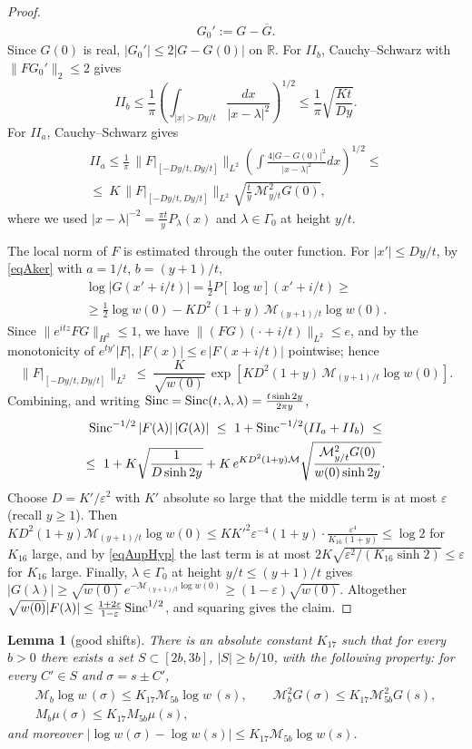 \documentclass[11pt,twoside,reqno]{amsart}
\def\R{{\mathbb R}}
\def\MM{{\mathcal M}}
\def\e{\varepsilon}
\def\l{\lambda}
\def\G{\Gamma}
\def\s{\sigma}
\def\S{\text{\rm Sinc}}
\theoremstyle{plain}
\newtheorem{lemma}{Lemma}
\numberwithin{equation}{section}
\begin{document}
\begin{proof}
$$\begin{gathered}
G_0':=G-\overline G .\end{gathered}$$
Since $G(0)$ is real, $|G_0'|\leq2|G-G(0)|$ on $\R$. For $II_b$, Cauchy--Schwarz with $\|FG_0'\|_2\leq2$ gives
$$II_b\leq\frac1\pi\left(\int_{|x|>Dy/t}\frac{dx}{|x-\l|^2}\right)^{1/2}\leq\frac1\pi\sqrt{\frac{Kt}{Dy}} .$$
For $II_a$, Cauchy--Schwarz gives
$$\begin{gathered}II_a\leq\frac1\pi\,\big\|F\big|_{[-Dy/t,Dy/t]}\big\|_{L^2}\left(\int\frac{4|G-G(0)|^2}{|x-\l|^2}dx\right)^{1/2}
\leq\\ \leq\ K\,\big\|F\big|_{[-Dy/t,Dy/t]}\big\|_{L^2}\sqrt{\frac{t}{y}\,\MM^2_{y/t}G(0)},\end{gathered}$$
where we used $|x-\l|^{-2}=\frac{\pi t}{y}P_\l(x)$ and $\l\in\G_0$ at height $y/t$.

The local norm of $F$ is estimated through the outer function. For $|x'|\leq Dy/t$, by \eqref{eqAker} with $a=1/t$, $b=(y+1)/t$,
$$\begin{gathered}\log|G(x'+i/t)|=\tfrac12P[\log w](x'+i/t)\geq\\
\geq\tfrac12\log w(0)-KD^2(1+y)\,\MM_{(y+1)/t}\log w(0) .\end{gathered}$$
Since $\|e^{itz}FG\|_{H^2}\leq1$, we have $\|(FG)(\cdot+i/t)\|_{L^2}\leq e$, and by the monotonicity of $e^{ty'}|F|$, $|F(x)|\leq e\,|F(x+i/t)|$ pointwise; hence
$$\big\|F\big|_{[-Dy/t,Dy/t]}\big\|_{L^2}\ \leq\ \frac{K}{\sqrt{w(0)}}\,\exp\left[KD^2(1+y)\,\MM_{(y+1)/t}\log w(0)\right] .$$
Combining, and writing $\S=\S(t,\l,\l)=\frac{t\sinh2y}{2\pi y}$,
$$\begin{gathered}\S^{-1/2}\,|F(\l)|\,|G(\l)|\ \leq\ 1+\S^{-1/2}(II_a+II_b)
\ \leq\\ \leq\ 1+K\sqrt{\frac1{D\sinh2y}}+K\,e^{KD^2(1+y)\MM}\sqrt{\frac{\MM^2_{y/t}G(0)}{w(0)\sinh2y}} .\end{gathered}$$
Choose $D=K'/\e^2$ with $K'$ absolute so large that the middle term is at most $\e$ (recall $y\geq1$). Then $KD^2(1+y)\MM_{(y+1)/t}\log w(0)\leq K K'^2\e^{-4}(1+y)\cdot\frac{\e^4}{K_{16}(1+y)}\leq\log2$ for $K_{16}$ large, and by \eqref{eqAupHyp} the last term is at most $2K\sqrt{\e^2/(K_{16}\sinh2)}\leq\e$ for $K_{16}$ large. Finally, $\l\in\G_0$ at height $y/t\leq(y+1)/t$ gives $|G(\l)|\geq\sqrt{w(0)}\,e^{-\MM_{(y+1)/t}\log w(0)}\geq(1-\e)\sqrt{w(0)}$. Altogether $\sqrt{w(0)}|F(\l)|\leq\frac{1+2\e}{1-\e}\,\S^{1/2}$, and squaring gives the claim.
\end{proof}

\begin{lemma}[good shifts]\label{lemAShift}
There is an absolute constant $K_{17}$ such that for every $b>0$ there exists a set $S\subset[2b,3b]$, $|S|\geq b/10$, with the following property: for every $C'\in S$ and $\s=s\pm C'$,
$$\begin{gathered}\MM_b\log w\,(\s)\leq K_{17}\MM_{5b}\log w\,(s),\qquad
\MM^2_bG(\s)\leq K_{17}\MM^2_{5b}G(s),\\
M_b\mu(\s)\leq K_{17}M_{5b}\mu(s),\end{gathered}$$
and moreover $|\log w(\s)-\log w(s)|\leq K_{17}\MM_{5b}\log w(s)$.
\end{lemma}
\end{document}
